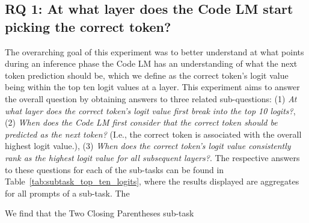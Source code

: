 \begin{table*}[t!]
    \centering
    \caption{Results of RQ 1: "At what layer does the Code LM start picking the correct token?", aggregated at the sub-task level. }
    \label{tab:subtask_top_ten_logits}
\end{table*}

\subsection{RQ 1: At what layer does the Code LM start picking the correct token?}\label{subsec:exp1}
The overarching goal of this experiment was to better understand at what points during an inference phase the Code LM has an understanding of what the next token prediction should be, which we define as the correct token's logit value being within the top ten logit values at a layer. This experiment aims to answer the overall question by obtaining answers to three related sub-questions: (1) \textit{At what layer does the correct token's logit value first break into the top 10 logits?}, (2) \textit{When does the Code LM first consider that the correct token should be predicted as the next token?} (I.e., the correct token is associated with the overall highest logit value.), (3) \textit{When does the correct token's logit value consistently rank as the highest logit value for all subsequent layers?}. The respective answers to these questions for each of the sub-tasks can be found in Table~\ref{tab:subtask_top_ten_logits}, where the results displayed are aggregates for all prompts of a sub-task. The 

We find that the Two Closing Parentheses sub-task 


